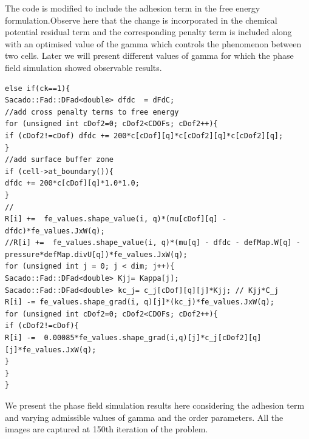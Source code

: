 \documentclass[idxtotoc,hyperref,openany]{labbook} %
\begin{document}



The code is modified to include the adhesion term in the free energy formulation.Observe here that the change is incorporated in the chemical potential residual term and the corresponding penalty term is included along with an optimised value of the gamma which controls the phenomenon between two cells. Later we will present different values of gamma for which the phase field simulation showed observable results. 


\begin{lstlisting}
else if(ck==1){
Sacado::Fad::DFad<double> dfdc  = dFdC;
//add cross penalty terms to free energy
for (unsigned int cDof2=0; cDof2<CDOFs; cDof2++){
if (cDof2!=cDof) dfdc += 200*c[cDof][q]*c[cDof2][q]*c[cDof2][q];
}
//add surface buffer zone
if (cell->at_boundary()){
dfdc += 200*c[cDof][q]*1.0*1.0;
}
//
R[i] +=  fe_values.shape_value(i, q)*(mu[cDof][q] - dfdc)*fe_values.JxW(q);
//R[i] +=  fe_values.shape_value(i, q)*(mu[q] - dfdc - defMap.W[q] - pressure*defMap.divU[q])*fe_values.JxW(q);
for (unsigned int j = 0; j < dim; j++){
Sacado::Fad::DFad<double> Kjj= Kappa[j];
Sacado::Fad::DFad<double> kc_j= c_j[cDof][q][j]*Kjj; // Kjj*C_j
R[i] -= fe_values.shape_grad(i, q)[j]*(kc_j)*fe_values.JxW(q);
for (unsigned int cDof2=0; cDof2<CDOFs; cDof2++){
if (cDof2!=cDof){
R[i] -=  0.00085*fe_values.shape_grad(i,q)[j]*c_j[cDof2][q][j]*fe_values.JxW(q);
}
}
}
\end{lstlisting}




We present the phase field simulation results here considering the adhesion term and varying admissible values of gamma and the order parameters. All the images are captured at 150th iteration of the problem.  
\end{document}
